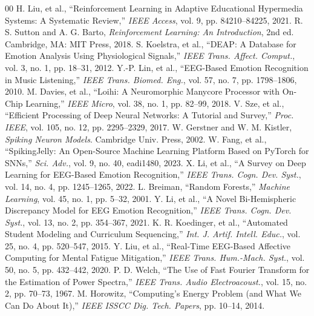 \documentclass[conference]{IEEEtran}
\begin{document}
\begin{thebibliography}{00}
 H. Liu, et al., ``Reinforcement Learning in Adaptive Educational Hypermedia Systems: A Systematic Review,'' \textit{IEEE Access}, vol. 9, pp. 84210--84225, 2021.
 R. S. Sutton and A. G. Barto, \textit{Reinforcement Learning: An Introduction}, 2nd ed. Cambridge, MA: MIT Press, 2018.
 S. Koelstra, et al., ``DEAP: A Database for Emotion Analysis Using Physiological Signals,'' \textit{IEEE Trans. Affect. Comput.}, vol. 3, no. 1, pp. 18--31, 2012.
 Y.-P. Lin, et al., ``EEG-Based Emotion Recognition in Music Listening,'' \textit{IEEE Trans. Biomed. Eng.}, vol. 57, no. 7, pp. 1798--1806, 2010.
 M. Davies, et al., ``Loihi: A Neuromorphic Manycore Processor with On-Chip Learning,'' \textit{IEEE Micro}, vol. 38, no. 1, pp. 82--99, 2018.
 V. Sze, et al., ``Efficient Processing of Deep Neural Networks: A Tutorial and Survey,'' \textit{Proc. IEEE}, vol. 105, no. 12, pp. 2295--2329, 2017.
 W. Gerstner and W. M. Kistler, \textit{Spiking Neuron Models}. Cambridge Univ. Press, 2002.
 W. Fang, et al., ``SpikingJelly: An Open-Source Machine Learning Platform Based on PyTorch for SNNs,'' \textit{Sci. Adv.}, vol. 9, no. 40, eadi1480, 2023.
 X. Li, et al., ``A Survey on Deep Learning for EEG-Based Emotion Recognition,'' \textit{IEEE Trans. Cogn. Dev. Syst.}, vol. 14, no. 4, pp. 1245--1265, 2022.
 L. Breiman, ``Random Forests,'' \textit{Machine Learning}, vol. 45, no. 1, pp. 5--32, 2001.
 Y. Li, et al., ``A Novel Bi-Hemispheric Discrepancy Model for EEG Emotion Recognition,'' \textit{IEEE Trans. Cogn. Dev. Syst.}, vol. 13, no. 2, pp. 354--367, 2021.
 K. R. Koedinger, et al., ``Automated Student Modeling and Curriculum Sequencing,'' \textit{Int. J. Artif. Intell. Educ.}, vol. 25, no. 4, pp. 520--547, 2015.
 Y. Liu, et al., ``Real-Time EEG-Based Affective Computing for Mental Fatigue Mitigation,'' \textit{IEEE Trans. Hum.-Mach. Syst.}, vol. 50, no. 5, pp. 432--442, 2020.
 P. D. Welch, ``The Use of Fast Fourier Transform for the Estimation of Power Spectra,'' \textit{IEEE Trans. Audio Electroacoust.}, vol. 15, no. 2, pp. 70--73, 1967.
 M. Horowitz, ``Computing's Energy Problem (and What We Can Do About It),'' \textit{IEEE ISSCC Dig. Tech. Papers}, pp. 10--14, 2014.
\end{thebibliography}
\end{document}
